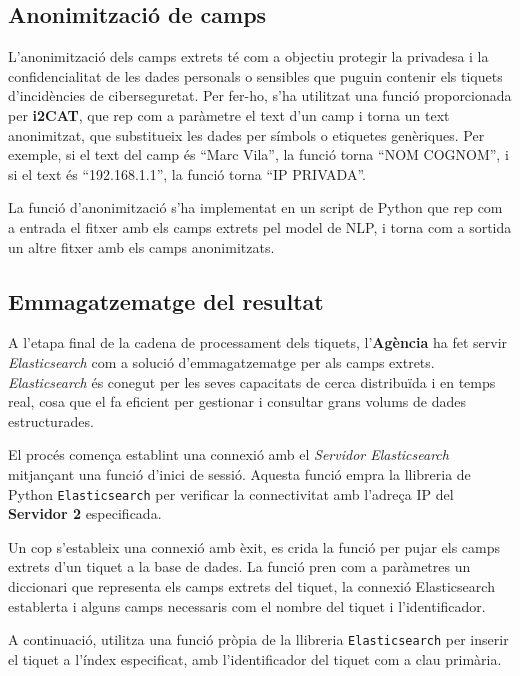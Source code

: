 \subsection{Anonimització de camps}
L'anonimització dels camps extrets té com a objectiu protegir la privadesa i la confidencialitat de les dades personals o sensibles que puguin contenir els tiquets d'incidències de ciberseguretat. Per fer-ho, s'ha utilitzat una funció proporcionada per \textbf{i2CAT}, que rep com a paràmetre el text d'un camp i torna un text anonimitzat, que substitueix les dades per símbols o etiquetes genèriques. Per exemple, si el text del camp és ``Marc Vila'', la funció torna ``NOM COGNOM'', i si el text és ``192.168.1.1'', la funció torna ``IP PRIVADA''.

La funció d'anonimització s'ha implementat en un script de Python que rep com a entrada el fitxer amb els camps extrets pel model de NLP, i torna com a sortida un altre fitxer amb els camps anonimitzats.


\subsection{Emmagatzematge del resultat}
A l'etapa final de la cadena de processament dels tiquets, l'\textbf{Agència} ha fet servir \textit{Elasticsearch} com a solució d'emmagatzematge per als camps extrets. \textit{Elasticsearch} és conegut per les seves capacitats de cerca distribuïda i en temps real, cosa que el fa eficient per gestionar i consultar grans volums de dades estructurades.

El procés comença establint una connexió amb el \textit{Servidor Elasticsearch} mitjançant una funció d'inici de sessió. Aquesta funció empra la llibreria de Python \texttt{Elasticsearch} per verificar la connectivitat amb l'adreça IP del \textbf{Servidor 2} especificada.

Un cop s'estableix una connexió amb èxit, es crida la funció per pujar els camps extrets d'un tiquet a la base de dades. La funció pren com a paràmetres un diccionari que representa els camps extrets del tiquet, la connexió Elasticsearch establerta i alguns camps necessaris com el nombre del tiquet i l'identificador.

A continuació, utilitza una funció pròpia de la llibreria \texttt{Elasticsearch} per inserir el tiquet a l'índex especificat, amb l'identificador del tiquet com a clau primària.
